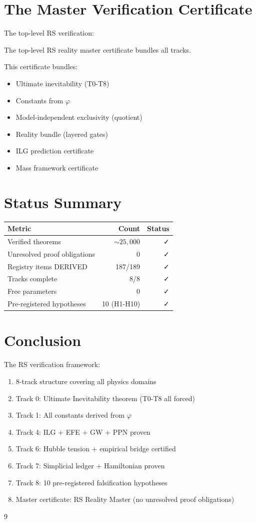 \documentclass[12pt,a4paper]{article}
\theoremstyle{definition}
\theoremstyle{remark}
\begin{document}
\section{The Master Verification Certificate}

The top-level RS verification:

The top-level RS reality master certificate bundles all tracks.

This certificate bundles:
\begin{itemize}
\item Ultimate inevitability (T0-T8)
\item Constants from $\varphi$ 
\item Model-independent exclusivity (quotient)
\item Reality bundle (layered gates)
\item ILG prediction certificate
\item Mass framework certificate
\end{itemize}

\section{Status Summary}

\begin{center}
\begin{tabular}{lrr}
\hline
\textbf{Metric} & \textbf{Count} & \textbf{Status} \\
\hline
Verified theorems & $\sim 25{,}000$ & ✓ \\
Unresolved proof obligations & 0 & ✓ \\
Registry items DERIVED & 187/189 & ✓ \\
Tracks complete & 8/8 & ✓ \\
Free parameters & 0 & ✓ \\
Pre-registered hypotheses & 10 (H1-H10) & ✓ \\
\hline
\end{tabular}
\end{center}

\section{Conclusion}

The RS verification framework:
\begin{enumerate}
\item 8-track structure covering all physics domains
\item Track 0: Ultimate Inevitability theorem (T0-T8 all forced)
\item Track 1: All constants derived from $\varphi$
\item Track 4: ILG + EFE + GW + PPN proven
\item Track 6: Hubble tension + empirical bridge certified
\item Track 7: Simplicial ledger + Hamiltonian proven
\item Track 8: 10 pre-registered falsification hypotheses
\item Master certificate: RS Reality Master (no unresolved proof obligations)
\end{enumerate}

\begin{thebibliography}{9}
\end{thebibliography}
\end{document}
